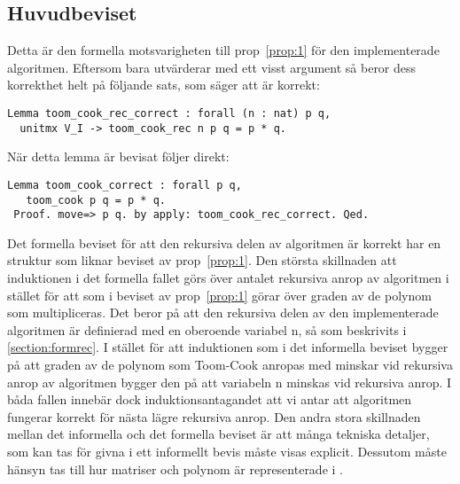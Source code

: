 \subsection{Huvudbeviset}
Detta är den formella motsvarigheten till prop~\ref{prop:1} för den
implementerade algoritmen. Eftersom  bara utvärderar
 med ett visst argument så beror dess korrekthet helt på
följande sats, som säger att  är korrekt:
\begin{lstlisting}
Lemma toom_cook_rec_correct : forall (n : nat) p q,
  unitmx V_I -> toom_cook_rec n p q = p * q.
\end{lstlisting}
När detta lemma är bevisat följer  direkt:
\begin{lstlisting}
Lemma toom_cook_correct : forall p q,
   toom_cook p q = p * q.
 Proof. move=> p q. by apply: toom_cook_rec_correct. Qed.
\end{lstlisting}
Det formella beviset för att den rekursiva delen av algoritmen är korrekt har
en struktur som liknar beviset av prop~\ref{prop:1}.
Den största skillnaden att induktionen i det formella fallet görs över antalet
rekursiva anrop av algoritmen i stället för att som i beviset av
prop~\ref{prop:1} görar över graden av de polynom som multipliceras. Det beror
på att den rekursiva delen av den implementerade algoritmen 
är definierad med en oberoende variabel n, så som beskrivits i
\ref{section:formrec}. I stället för att induktionen som i det informella
beviset bygger på att graden av de polynom som Toom-Cook anropas med minskar
vid rekursiva anrop av algoritmen bygger den på att variabeln n minskas vid
rekursiva anrop. I båda fallen innebär dock induktionsantagandet att vi antar
att algoritmen fungerar korrekt för nästa lägre rekursiva anrop.
Den andra stora skillnaden mellan det informella och det formella beviset är
att många tekniska detaljer, som kan tas för givna i ett informellt bevis måste
visas explicit. Dessutom måste hänsyn tas till hur matriser och polynom är
representerade i \ssr{}.

